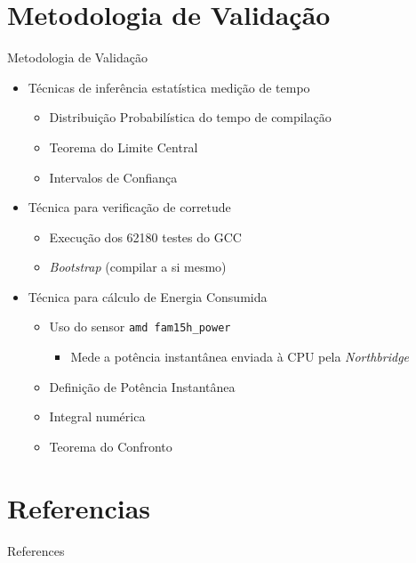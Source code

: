\section{Metodologia de Validação}

\begin{frame}{Metodologia de Validação}
    \begin{itemize}
        \item Técnicas de inferência estatística medição de tempo
            \begin{itemize}
                \item Distribuição Probabilística do tempo de compilação
                \item Teorema do Limite Central
                \item Intervalos de Confiança
            \end{itemize}
        \item Técnica para verificação de corretude
            \begin{itemize}
                \item Execução dos 62180 testes do GCC
                \item \textit{Bootstrap} (compilar a si mesmo)
            \end{itemize}
        \item Técnica para cálculo de Energia Consumida
        \begin{itemize}
            \item Uso do sensor \texttt{amd fam15h\_power}
            \begin{itemize}
                \item Mede a potência instantânea enviada à CPU pela \textit{Northbridge}
            \end{itemize}

            \item Definição de Potência Instantânea
            \item Integral numérica
            \item Teorema do Confronto
        \end{itemize}
    \end{itemize}
\end{frame}

\section{Referencias}

\begin{frame}[allowframebreaks]{References}
  \printbibliography
\end{frame}

